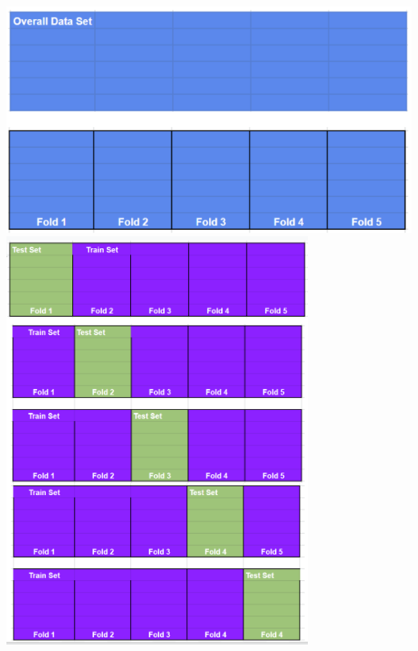 \documentclass[twoside,11pt]{article}
\begin{document}
\begin{center}
\includegraphics[scale=.6]{kfold1}\newline 
\includegraphics[scale=1]{kfold2}\newline 
\end{center}
\end{document}
